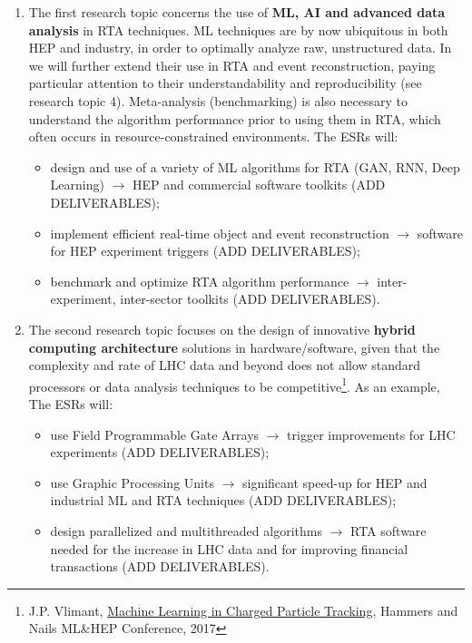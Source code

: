 \begin{enumerate}%

\item The first research topic concerns the use of \textbf{ML, AI and advanced data analysis} in RTA techniques.
ML techniques are by now ubiquitous in both HEP and industry, in order to optimally analyze raw, unstructured data. In \acronym we will further extend their use in RTA and event reconstruction, paying particular attention to their understandability and reproducibility (see research topic 4).   
Meta-analysis (benchmarking) is also necessary to understand the algorithm performance prior to using them in RTA, which often occurs in resource-constrained environments.
The \acronym ESRs will:
\begin{itemize}
\item design and use of a variety of ML algorithms for RTA (GAN, RNN, Deep Learning) $\rightarrow$ HEP and commercial software toolkits (ADD DELIVERABLES); 
\item implement efficient real-time object and event reconstruction $\rightarrow$ software for HEP experiment triggers (ADD DELIVERABLES);
\item benchmark and optimize RTA algorithm performance $\rightarrow$ inter-experiment, inter-sector toolkits (ADD DELIVERABLES). 
\end{itemize}

\item The second research topic focuses on the design of innovative \textbf{hybrid computing architecture} solutions in hardware/software, given that the complexity and rate of LHC data and beyond does not allow standard processors or data analysis techniques to be competitive\footnote{J.P. Vlimant, \href{https://erez.weizmann.ac.il/pls/htmldb/f?p=101:58:::NO:RP:P58_CODE,P58_FILE:5393,Y}{Machine Learning in Charged Particle Tracking}, Hammers and Nails ML\&HEP Conference, 2017}. 
As an example, 
The \acronym ESRs will:
\begin{itemize}
\item use Field Programmable Gate Arrays $\rightarrow$ trigger improvements for LHC experiments (ADD DELIVERABLES);
\item use Graphic Processing Units $\rightarrow$ significant speed-up for HEP and industrial ML and RTA techniques (ADD DELIVERABLES);%
\item design parallelized and multithreaded algorithms $\rightarrow$ RTA software needed for the increase in LHC data and for improving financial transactions (ADD DELIVERABLES).
\end{itemize}


\end{enumerate}
